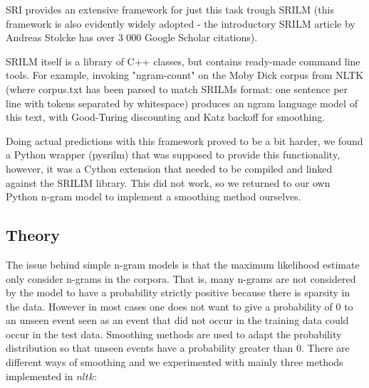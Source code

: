 \documentclass[a4paper,12pt]{article}
\begin{document}
SRI provides an extensive framework for just this task trough SRILM (this framework is also evidently widely adopted - the introductory SRILM article by Andreas Stolcke has over 3 000 Google Scholar citations). 

SRILM itself is a library of C++ classes, but contains ready-made command line tools. For example, invoking "ngram-count" on the Moby Dick corpus from NLTK (where corpus.txt has been parsed to match SRILMs format: one sentence per line with tokens separated by whitespace) produces an ngram language model of this text, with Good-Turing discounting and Katz backoff for smoothing.

Doing actual predictions with this framework proved to be a bit harder, we found a Python wrapper (pysrilm) that was supposed to provide this functionality, however, it was a Cython extension that needed to be compiled and linked against the SRILIM library. This did not work, so we returned to our own Python n-gram model to implement a smoothing method ourselves.

\label{sec:ngramsmoothing}

\subsection{Theory}
	The issue behind simple n-gram models is that the maximum likelihood estimate only consider n-grams in the corpora. That is, many n-grams are not considered by the model to have a probability strictly positive because there is sparsity in the data. However in most cases one does not want to give a probability of 0 to an unseen event seen as an event that did not occur in the training data could occur in the test data. Smoothing methods are used to adapt the probability distribution so that unseen events have a probability greater than 0. There are different ways of smoothing and we experimented with mainly three methods implemented in $nltk$:
	
\end{document}
